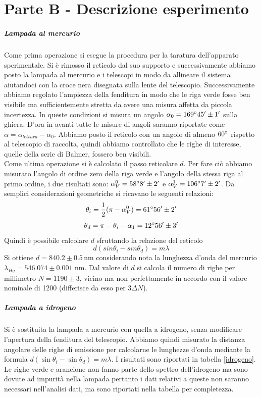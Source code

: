 \documentclass[10pt,a4paper]{article}
\begin{document}
\section{Parte B - Descrizione esperimento}
\subparagraph{Lampada al mercurio}
Come prima operazione si esegue la procedura per la taratura dell'apparato sperimentale. Si è rimosso il reticolo dal suo supporto e successivamente abbiamo posto la lampada al mercurio e i telescopi in modo da allineare il sistema aiutandoci con la croce nera disegnata sulla lente del telescopio. Successivamente abbiamo regolato l'ampiezza della fenditura in modo che le riga verde fosse ben visibile ma sufficientemente stretta da avere una misura affetta da piccola incertezza. In queste condizioni si misura un angolo $\alpha_0 = 169 \degree 45 '\pm 1'$ sulla ghiera. D'ora in avanti tutte le misure di angoli saranno riportate come $\alpha=\alpha_{lettura}-\alpha_0$. Abbiamo posto il reticolo con un angolo di almeno $60\degree$ rispetto al telescopio di raccolta, quindi abbiamo controllato che le righe di interesse, quelle della serie di Balmer, fossero ben visibili.\\
Come ultima operazione si è calcolato il passo reticolare $d$. Per fare ciò abbiamo misurato l'angolo di ordine zero della riga verde e l'angolo della stessa riga al primo ordine, i due risultati sono: $\alpha_V^{0} = 58 \degree 8 ' \pm 2'$ e $\alpha_V^{1} = 106 \degree 7' \pm 2'$. Da semplici considerazioni geometriche si ricavano le seguenti relazioni:
\begin{equation}
\theta_i=\frac{1}{2}(\pi-\alpha_V^{0})=61\degree 56'\pm2'
\end{equation}
\begin{equation}
\theta_d=\pi-\theta_i-\alpha_1= 12 \degree 56' \pm 3'
\end{equation}
Quindi è possibile calcolare $d$ sfruttando la relazione del reticolo 
\begin{equation}
d(sin{\theta_i}-sin{\theta_d})=m\lambda
\end{equation}
Si ottiene $d = 840.2 \pm 0.5 \,\mbox{nm}$ considerando nota la lunghezza d'onda del mercurio $\lambda_{Hg}=546.074\pm0.001\,\,\mbox{nm}$. Dal valore di $d$ si calcola il numero di righe per millimetro $N = 1190 \pm 3$, vicino ma non perfettamente in accordo con il valore nominale di 1200 (differisce da esso per $3 \Delta N$).

\subparagraph{Lampada a idrogeno}
Si è sostituita la lampada a mercurio con quella a idrogeno, senza modificare l'apertura della fenditura del telescopio. Abbiamo quindi misurato la distanza angolare delle righe di emissione per calcolarne le lunghezze d'onda mediante la formula $d(\sin{\theta_i}-\sin{\theta_d})=m\lambda$. I risultati sono riportati in tabella \ref{idrogeno}. Le righe verde e arancione non fanno parte dello spettro dell'idrogeno ma sono dovute ad impurità nella lampada pertanto i dati relativi a queste non saranno necessari nell'analisi dati, ma sono riportati nella tabella per completezza.\\
\end{document}
